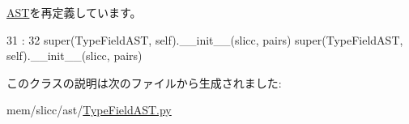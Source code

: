 \hyperlink{classslicc_1_1ast_1_1AST_1_1AST_ac775ee34451fdfa742b318538164070e}{AST}を再定義しています。


\begin{DoxyCode}
31                                     :
32         super(TypeFieldAST, self).__init__(slicc, pairs)
        super(TypeFieldAST, self).__init__(slicc, pairs)
\end{DoxyCode}


このクラスの説明は次のファイルから生成されました:\begin{DoxyCompactItemize}
\item 
mem/slicc/ast/\hyperlink{TypeFieldAST_8py}{TypeFieldAST.py}\end{DoxyCompactItemize}
